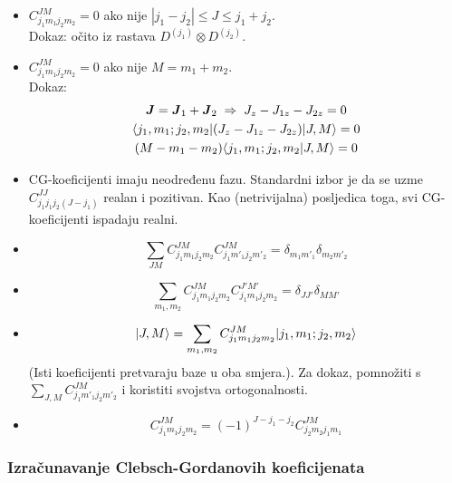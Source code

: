 \begin{itemize}
\item $C^{JM}_{j_1m_1j_2m_2}=0$ ako nije $|j_1-j_2|\le J\le j_1 + j_2$. \\
Dokaz: očito iz rastava $D^{(j_1)}\otimes D^{(j_2)}$.

\item $C^{JM}_{j_1m_1j_2m_2}=0$ ako nije $M=m_1+m_2$.\\
Dokaz: 
\begin{gather}
\vec{J}=\vec{J}_{1}+\vec{J}_{2} \imp J_z-J_{1z}-J_{2z}=0 \\
\bra{j_1, m_1; j_2, m_2}(J_z-J_{1z}-J_{2z})\ket{J, M} = 0 \\
(M-m_1-m_2)\bra{j_1, m_1; j_2, m_2} J, M\rangle = 0
\end{gather}

\item CG-koeficijenti imaju neodređenu fazu. Standardni izbor je
da se uzme $C^{JJ}_{j_1 j_1 j_2 (J-j_1)}$ realan i pozitivan.
Kao (netrivijalna) posljedica toga, svi CG-koeficijenti ispadaju realni.

\item
\begin{displaymath}
 \sum_{JM} C^{JM}_{j_1m_1j_2m_2} C^{JM}_{j_1m'_1j_2m'_2} =
\delta_{m_1 m'_1} \delta_{m_2 m'_2}
\end{displaymath}

\item
\begin{displaymath}
  \sum_{m_1, m_2} C^{JM}_{j_1m_1j_2m_2}C^{J'M'}_{j_1m_1j_2m_2} =
 \delta_{JJ'}\delta_{MM'}
\end{displaymath}

\item
\begin{displaymath}
 | J, M \rangle = \sum_{m_1, m_2} C^{JM}_{j_1m_1j_2m_2}| j_1, m_1; j_2, m_2 \rangle
\end{displaymath}
(Isti koeficijenti pretvaraju baze u oba smjera.). Za dokaz, 
pomnožiti s $\sum_{J,M}C^{JM}_{j_1m'_1j_2m'_2}$ i koristiti svojstva
ortogonalnosti.

\item
\begin{displaymath}
 C^{JM}_{j_1m_1j_2m_2} = (-1)^{J-j_1 -j_2} C^{JM}_{j_2 m_2 j_1 m_1}
\end{displaymath}
\end{itemize}

\subsubsection{Izračunavanje Clebsch-Gordanovih koeficijenata}
\label{tripletsinglet}


